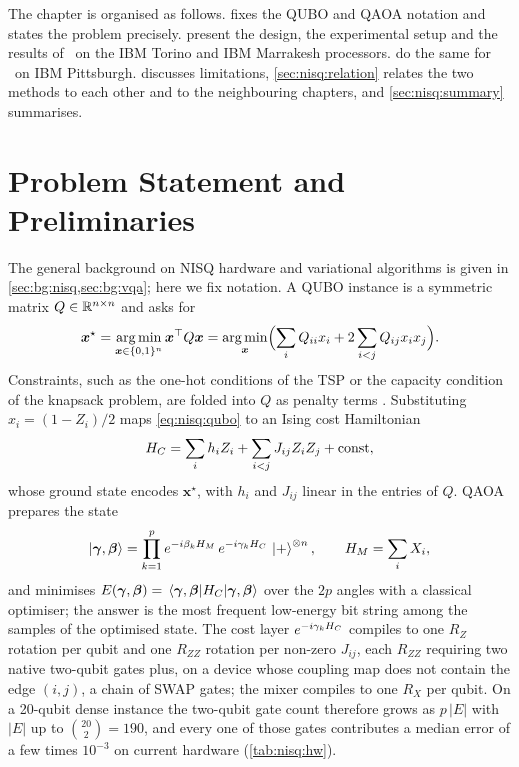 The chapter is organised as follows.  fixes the QUBO and QAOA notation and states the problem precisely.  present the design, the experimental setup and the results of \deal\ on the IBM Torino and IBM Marrakesh processors.  do the same for \qawa\ on IBM Pittsburgh.  discusses limitations, \cref{sec:nisq:relation} relates the two methods to each other and to the neighbouring chapters, and \cref{sec:nisq:summary} summarises.

\section{Problem Statement and Preliminaries}\label{sec:nisq:problem}

The general background on NISQ hardware and variational algorithms is given in \cref{sec:bg:nisq,sec:bg:vqa}; here we fix notation. A QUBO instance is a symmetric matrix $Q\in\mathbb{R}^{n\times n}$ and asks for
\begin{equation}\label{eq:nisq:qubo}
  \bm{x}^{\star} = \operatorname*{arg\,min}_{\bm{x}\in\{0,1\}^{n}} \bm{x}^{\top} Q \bm{x}
  = \operatorname*{arg\,min}_{\bm{x}} \Bigl(\sum_{i} Q_{ii}x_{i} + 2\sum_{i<j} Q_{ij}x_{i}x_{j}\Bigr).
\end{equation}
Constraints, such as the one-hot conditions of the TSP or the capacity condition of the knapsack problem, are folded into $Q$ as penalty terms \cite{glover2018qubo,montanezbarrera2024unbalanced}. Substituting $x_{i}=(1-Z_{i})/2$ maps \cref{eq:nisq:qubo} to an Ising cost Hamiltonian
\begin{equation}\label{eq:nisq:ising}
  H_C = \sum_{i} h_{i} Z_{i} + \sum_{i<j} J_{ij} Z_{i}Z_{j} + \text{const},
\end{equation}
whose ground state encodes $\bm{x}^{\star}$, with $h_{i}$ and $J_{ij}$ linear in the entries of $Q$. QAOA prepares the state
\begin{equation}\label{eq:nisq:qaoa}
  \ket{\bm{\gamma},\bm{\beta}} = \prod_{k=1}^{p} e^{-i\beta_{k}H_M}\, e^{-i\gamma_{k}H_C}\, \ket{+}^{\otimes n},
  \qquad H_M = \sum_{i} X_{i},
\end{equation}
and minimises $E(\bm{\gamma},\bm{\beta})=\expval{H_C}{\bm{\gamma},\bm{\beta}}$ over the $2p$ angles with a classical optimiser; the answer is the most frequent low-energy bit string among the samples of the optimised state. The cost layer $e^{-i\gamma_{k}H_C}$ compiles to one $R_{Z}$ rotation per qubit and one $R_{ZZ}$ rotation per non-zero $J_{ij}$, each $R_{ZZ}$ requiring two native two-qubit gates plus, on a device whose coupling map does not contain the edge $(i,j)$, a chain of SWAP gates; the mixer compiles to one $R_{X}$ per qubit. On a 20-qubit dense instance the two-qubit gate count therefore grows as $p\,|E|$ with $|E|$ up to $\binom{20}{2}=190$, and every one of those gates contributes a median error of a few times $10^{-3}$ on current hardware (\cref{tab:nisq:hw}).

